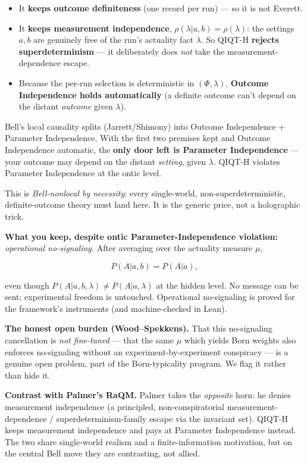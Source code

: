 \documentclass[11pt,a4paper]{article}
\begin{document}
\begin{itemize}
  \item It \textbf{keeps outcome definiteness} (one record per run) — so it is not Everett.
  \item It \textbf{keeps measurement independence}, $\rho(\lambda|a,b)=\rho(\lambda)$: the settings $a,b$ are genuinely free of the run's actuality fact $\lambda$. So QIQT-H \textbf{rejects superdeterminism} — it deliberately does \emph{not} take the measurement-dependence escape.
  \item Because the per-run selection is deterministic in $(\Phi,\lambda)$, \textbf{Outcome Independence holds automatically} (a definite outcome can't depend on the distant \emph{outcome} given $\lambda$).
\end{itemize}

Bell's local causality splits (Jarrett/Shimony) into Outcome Independence + Parameter Independence. With the first two premises kept and Outcome Independence automatic, the \textbf{only door left is Parameter Independence} — your outcome may depend on the distant \emph{setting}, given $\lambda$. QIQT-H violates Parameter Independence at the ontic level.

This is \emph{Bell-nonlocal by necessity}: every single-world, non-superdeterministic, definite-outcome theory must land here. It is the generic price, not a holographic trick.

\textbf{What you keep, despite ontic Parameter-Independence violation:} \emph{operational no-signaling.} After averaging over the actuality measure $\mu$,

\[
P(A|a,b) = P(A|a),
\]

even though $P(A|a,b,\lambda)\neq P(A|a,\lambda)$ at the hidden level. No message can be sent; experimental freedom is untouched. Operational no-signaling is proved for the framework's instruments (and machine-checked in Lean).

\textbf{The honest open burden (Wood–Spekkens).} That this no-signaling cancellation is \emph{not fine-tuned} — that the same $\mu$ which yields Born weights also enforces no-signaling without an experiment-by-experiment conspiracy — is a genuine open problem, part of the Born-typicality program. We flag it rather than hide it.

\textbf{Contrast with Palmer's RaQM.} Palmer takes the \emph{opposite} horn: he denies measurement independence (a principled, non-conspiratorial measurement-dependence / superdeterminism-family escape via the invariant set). QIQT-H keeps measurement independence and pays at Parameter Independence instead. The two share single-world realism and a finite-information motivation, but on the central Bell move they are contrasting, not allied.
\end{document}
